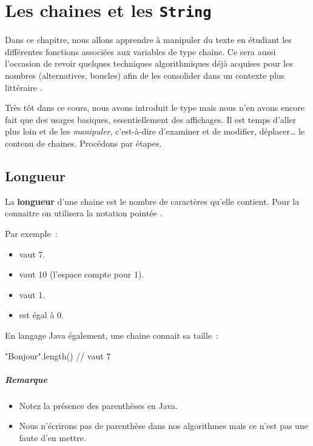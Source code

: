 \chapter{Les chaines et les \texttt{String}}

	Dans ce chapitre, nous allons apprendre à manipuler du texte en étudiant les
	différentes fonctions associées aux variables de type chaine.  Ce sera aussi
	l’occasion de revoir quelques techniques algorithmiques déjà acquises pour
	les nombres (alternatives, boucles) afin de les consolider dans un contexte
	plus \og littéraire \fg.

	
	Très tôt dans ce cours, nous avons introduit le type  mais nous
	n’en avons encore fait que des usages basiques, essentiellement des
	affichages.  Il est temps d’aller plus loin et de les \emph{manipuler},
	c’est-à-dire d’examiner et de modifier, déplacer… le contenu de chaines.
	Procédons par étapes.
	
	\minitoc

	\clearpage
\section{Longueur}
	
	 La \textbf{longueur}
	d’une chaine est le nombre de caractères qu’elle contient.  Pour la
	connaitre on utilisera la notation pointée .
	
	Par exemple~:

	\begin{itemize}
	\item {} vaut 7.
	\item {} vaut 10 (l’espace compte pour 1).
	\item {} vaut 1.
	\item {} est égal à 0.
	\end{itemize}

	En langage Java également, une chaine connait sa taille~:

	\begin{java}
"Bonjour".length() // vaut 7		
	\end{java}

	\paragraph{Remarque}
	\begin{itemize}
		\item Notez la présence des parenthèses en Java. 
		
		\item Nous n'écrirons pas de parenthèse dans nos algorithmes mais ce
			n'est pas une faute d'en mettre. 
	
	\end{itemize}

